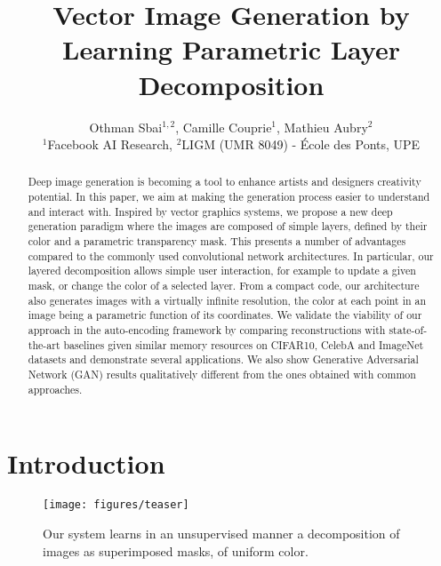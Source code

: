 \documentclass[10pt,twocolumn,letterpaper]{article}
\begin{document}
\title{Vector Image Generation by Learning Parametric Layer Decomposition}

\author{
Othman Sbai$^{1,2}$, Camille Couprie$^1$, Mathieu Aubry$^2$\\
$^1$Facebook AI Research, $^2$LIGM (UMR 8049) - \'Ecole des Ponts, UPE
}

\maketitle

\begin{abstract}
   Deep image generation is becoming a tool to enhance artists and designers creativity potential. In this paper, we aim at making the generation process easier to understand and interact with. Inspired by vector graphics systems, we propose a new deep generation paradigm where the images are composed of simple layers, defined by their color and a parametric transparency mask. This presents a number of advantages compared to the commonly used convolutional network architectures. In particular, our layered decomposition allows simple user interaction, for example to update a given mask, or change the color of a selected layer. From a compact code, our architecture also generates images with a virtually infinite resolution, the color at each point in an image being a parametric function of its coordinates. We validate the viability of our approach in the auto-encoding framework by comparing reconstructions with state-of-the-art baselines given similar memory resources on CIFAR10, CelebA and ImageNet datasets and demonstrate several applications. We also show Generative Adversarial Network (GAN) results qualitatively different from the ones obtained with common approaches.
\end{abstract}


\section{Introduction}

\begin{figure}
    \centering
    \texttt{[image: figures/teaser]}
    \caption{Our system learns in an unsupervised manner a decomposition of images as superimposed masks, of uniform color.}
    \label{fig:my_label}
\end{figure}

\end{document}
